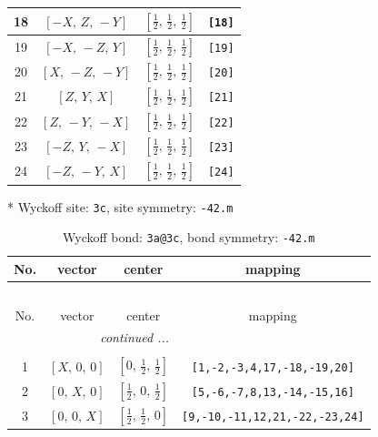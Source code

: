\documentclass[fleqn,8pt]{jsarticle}
\begin{document}
\begin{longtable}{cccc}
18 & $\left[ - X,\, Z,\, - Y \right]$ & $\left[ \frac{1}{2},\, \frac{1}{2},\, \frac{1}{2} \right]$ & {\tt [18]} \\ \hline
19 & $\left[ - X,\, - Z,\, Y \right]$ & $\left[ \frac{1}{2},\, \frac{1}{2},\, \frac{1}{2} \right]$ & {\tt [19]} \\ \hline
20 & $\left[ X,\, - Z,\, - Y \right]$ & $\left[ \frac{1}{2},\, \frac{1}{2},\, \frac{1}{2} \right]$ & {\tt [20]} \\ \hline
21 & $\left[ Z,\, Y,\, X \right]$ & $\left[ \frac{1}{2},\, \frac{1}{2},\, \frac{1}{2} \right]$ & {\tt [21]} \\ \hline
22 & $\left[ Z,\, - Y,\, - X \right]$ & $\left[ \frac{1}{2},\, \frac{1}{2},\, \frac{1}{2} \right]$ & {\tt [22]} \\ \hline
23 & $\left[ - Z,\, Y,\, - X \right]$ & $\left[ \frac{1}{2},\, \frac{1}{2},\, \frac{1}{2} \right]$ & {\tt [23]} \\ \hline
24 & $\left[ - Z,\, - Y,\, X \right]$ & $\left[ \frac{1}{2},\, \frac{1}{2},\, \frac{1}{2} \right]$ & {\tt [24]} \\
\end{longtable}
* Wyckoff site: {\tt 3c}, site symmetry: {\tt -42.m}
\renewcommand{\arraystretch}{1.2}
\begin{longtable}{cccc}
\caption{Wyckoff bond: {\tt 3a@3c}, bond symmetry: {\tt -42.m}}
 \\
 \hline \hline
No. & vector & center & mapping \\ \hline \endfirsthead

\multicolumn{3}{l}{\tablename\ \thetable{}} \\
 \hline \hline
No. & vector & center & mapping \\ \hline \endhead

 \hline \hline
\multicolumn{3}{r}{\footnotesize\it continued ...} \\ \endfoot

 \hline \hline
\multicolumn{3}{r}{} \\ \endlastfoot

1 & $\left[ X,\, 0,\, 0 \right]$ & $\left[ 0,\, \frac{1}{2},\, \frac{1}{2} \right]$ & {\tt [1,-2,-3,4,17,-18,-19,20]} \\ \hline
2 & $\left[ 0,\, X,\, 0 \right]$ & $\left[ \frac{1}{2},\, 0,\, \frac{1}{2} \right]$ & {\tt [5,-6,-7,8,13,-14,-15,16]} \\ \hline
3 & $\left[ 0,\, 0,\, X \right]$ & $\left[ \frac{1}{2},\, \frac{1}{2},\, 0 \right]$ & {\tt [9,-10,-11,12,21,-22,-23,24]} \\
\end{longtable}
\end{document}
